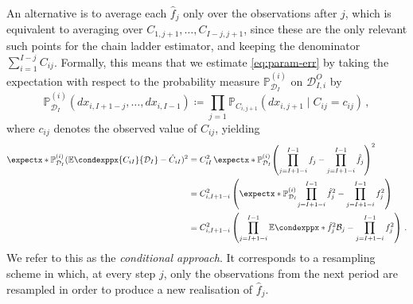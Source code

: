 \documentclass[a4paper]{book}
\theoremstyle{plain}
\newcommand{\condexpp}{\mathbb{E}\condexppx}
\newcommand\expect[2][]{\expectx*{#1}{#2}}
\begin{document}
An alternative is to average each $\hat{f}_j$ only over the observations after $j$, which is equivalent to averaging over $C_{1, j + 1}, \dots, C_{I - j, j + 1}$, since these are the only relevant such points for the chain ladder estimator, and keeping the denominator $\sum_{i = 1}^{I - j} C_{ij}$. Formally, this means that we estimate \cref{eq:param-err} by taking the expectation with respect to the probability measure $\mathbb{P}^{(i)}_{\mathcal{D}_I}$ on $\mathcal{D}^O_{I, i}$ by
\begin{equation}
  \mathbb{P}^{(i)}_{\mathcal{D}_I}(dx_{i, I + 1 - j}, \dots, dx_{i, I - 1}) \coloneqq \prod_{j = 1} \mathbb{P}_{C_{i, j + 1}}(dx_{i, j + 1} \mid C_{ij} = c_{ij}) \,,
\end{equation}
where $c_{ij}$ denotes the observed value of $C_{ij}$, yielding
\begin{align}
    \expect[\mathbb{P}^{(i)}_{\mathcal{D}_I}]{(\condexpp{C_{iI}}{\mathcal{D}_I} - \hat{C}_{iI})^2}&= C^2_{iI} \, \expect[\mathbb{P}^{(i)}_{\mathcal{D}_I}]{\left( \prod_{j=I+1-i}^{I-1}f_j - \prod_{j=I+1-i}^{I-1}\hat{f}_j \right)^2} \\ 
    &= C^2_{i, I+1-i} \left( \expect[\mathbb{P}^{(i)}_{\mathcal{D}_I}]{\prod_{j=I+1-i}^{I-1}\hat{f}^2_j} - \prod_{j=I+1-i}^{I-1}f^2_j \right) \\
    &= C^2_{i, I+1-i} \left( \prod_{j=I+1-i}^{I-1} \condexpp*{\hat{f}^2_j}{\mathcal{B}_j} - \prod_{j=I+1-i}^{I-1}f^2_j \right) \,.
\end{align}
We refer to this as the \emph{conditional approach}. It corresponds to a resampling scheme in which, at every step $j$, only the observations from the next period are resampled in order to produce a new realisation of $\hat{f}_j$.
\end{document}
